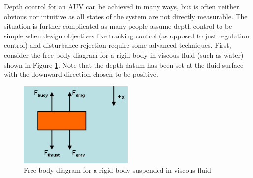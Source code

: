 \documentclass{article}
\begin{document}
\maketitle

Depth control for an AUV can be achieved in many ways, but is often neither obvious nor intuitive as all states of the system are not directly measurable.  The situation is further complicated as many people assume depth control to be simple when design objectives like tracking control (as opposed to just regulation control) and disturbance rejection require some advanced techniques.  First, consider the free body diagram for a rigid body in viscous fluid (such as water) shown in Figure \ref{fig:freeBody}.  Note that the depth datum has been set at the fluid surface with the downward direction chosen to be positive.

\begin{figure}[h]
\includegraphics[width=0.5\textwidth]{FreeBodyDiagram.png}
\centering
\caption{Free body diagram for a rigid body suspended in viscous fluid}\label{fig:freeBody}
\end{figure}
\end{document}
